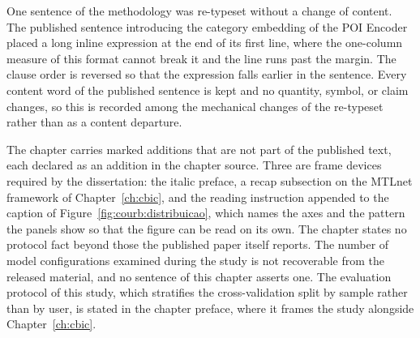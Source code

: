One sentence of the methodology was re-typeset without a change of content. The
published sentence introducing the category embedding of the POI Encoder placed a long
inline expression at the end of its first line, where the one-column measure of this
format cannot break it and the line runs past the margin. The clause order is reversed
so that the expression falls earlier in the sentence. Every content word of the
published sentence is kept and no quantity, symbol, or claim changes, so this is
recorded among the mechanical changes of the re-typeset rather than as a content
departure.

The chapter carries marked additions that are not part of the published text, each
declared as an addition in the chapter source. Three are frame devices required by the
dissertation: the italic preface, a recap subsection on the MTLnet framework of
Chapter~\ref{ch:cbic}, and the reading instruction appended to the caption of
Figure~\ref{fig:courb:distribuicao}, which names the axes and the pattern the panels show
so that the figure can be read on its own. The chapter states no protocol fact beyond
those the published paper itself reports. The number of model
configurations examined during the study is not recoverable from the released material, and no
sentence of this chapter asserts one. The evaluation protocol of this study, which
stratifies the cross-validation split by sample rather than by user, is stated in the
chapter preface, where it frames the study alongside Chapter~\ref{ch:cbic}.
